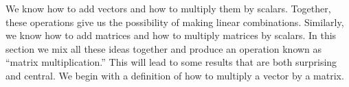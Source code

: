 %
\begin{introduction}
\begin{para}We know how to add vectors and how to multiply them by scalars.  Together, these operations give us the possibility of making linear combinations.  Similarly, we know how to add matrices and how to multiply matrices by scalars.  In this section we mix all these ideas together and produce an operation known as ``matrix multiplication.''  This will lead to some results that are both surprising and central.  We begin with a definition of how to multiply a vector by a matrix.\end{para}
\end{introduction}
%
